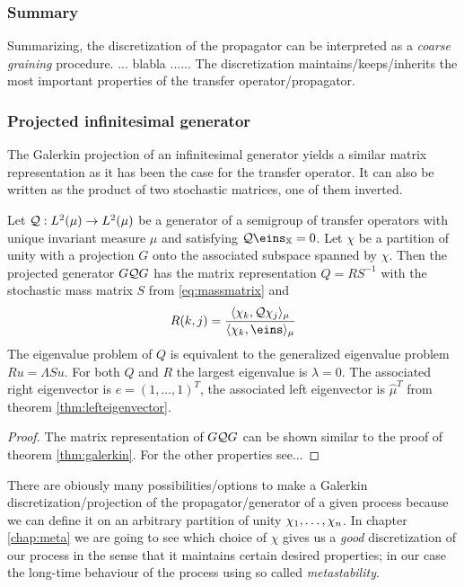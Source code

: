 \subsubsection*{Summary}
Summarizing, the discretization of the propagator can be interpreted as a \textit{coarse graining} procedure.
... blabla ......
The discretization maintains/keeps/inherits the most important properties of the transfer operator/propagator.

\subsubsection*{Projected infinitesimal generator}

The Galerkin projection of an infinitesimal generator yields a similar matrix representation as it has been the case for the transfer operator. It can also be written as the product of two stochastic matrices, one of them inverted.

\begin{thm}
Let $\mathcal{Q}: L^2(\mu) \rightarrow L^2(\mu)$ be a generator of a semigroup of transfer operators with unique invariant measure $\mu$ and satisfying $\Qcal\eins_\X = 0$.
Let $\chi$ be a partition of unity with a projection $G$ onto the associated subspace spanned by $\chi$.
Then the projected generator $G \mathcal{Q} G$ has the matrix representation $Q = RS^{-1}$ with the stochastic mass matrix $S$ from \eqref{eq:massmatrix} and 
\begin{equation}
R(k,j) = \frac{\langle \chi_k, \Qcal\chi_j \rangle_\mu}{\langle \chi_k, \eins \rangle_\mu}
\end{equation}
The eigenvalue problem of $Q$ is equivalent to the generalized eigenvalue problem $Ru = \Lambda Su$.
For both $Q$ and $R$ the largest eigenvalue is $\lambda = 0$. The associated right eigenvector is $e=(1,\dots,1)^T$, the associated left eigenvector is $\hat{\mu}^T$ from theorem \ref{thm:lefteigenvector}.
\end{thm}
\begin{proof}
The matrix representation of $G\mathcal{Q} G$ can be shown similar to the proof of theorem \ref{thm:galerkin}. For the other properties see...
\end{proof}

There are obiously many possibilities/options to make a Galerkin discretization/projection of the propagator/generator of a given process because we can define it on an arbitrary partition of unity $\chi_1,\dots,\chi_n$.
In chapter \ref{chap:meta} we are going to see which choice of $\chi$ gives us a \textit{good} discretization of our process in the sense that it maintains certain desired properties; in our case the long-time behaviour of the process using so called \textit{metastability}.
